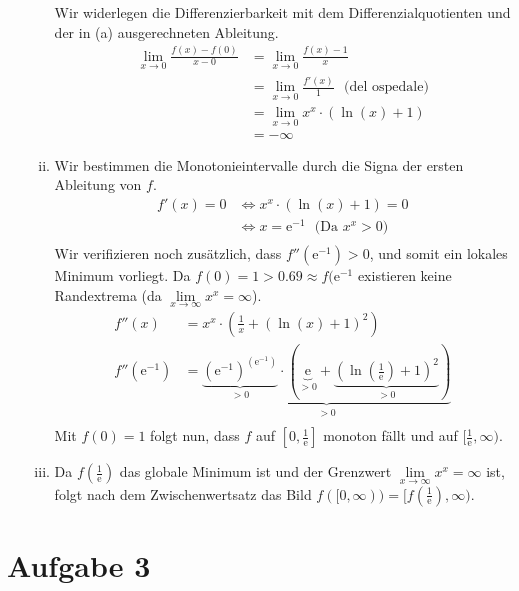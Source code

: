\documentclass{scrreprt}
\newcommand{\round}[1]{\left(#1\right)}
\newcommand{\euler}{\mathrm{e}}
\newcommand{\round}[1]{\left\(#1\right\)}
\begin{document}
\begin{enumerate}[(a)]
\begin{enumerate}[(i)]
        Wir widerlegen die Differenzierbarkeit mit dem Differenzialquotienten und der in (a) ausgerechneten Ableitung.
        \begin{align*}
            \lim\limits_{x \to 0} \frac{f\round{x} - f\round{0}}{x-0} & = \lim\limits_{x \to 0} \frac{f\round{x} - 1}{x}\\
            & = \lim\limits_{x \to 0} \frac{f'\round{x}}{1} ~~~ \text{(del ospedale)}\\
            & = \lim\limits_{x \to 0} x^x \cdot \round{\ln\round{x} + 1}\\
            & = -\infty
        \end{align*}
    \item
        Wir bestimmen die Monotonieintervalle durch die Signa der ersten Ableitung von $f$.
        \begin{align*}
            f'(x) = 0 &\Leftrightarrow x^x \cdot \round{\ln(x) + 1} = 0\\
            & \Leftrightarrow x = \euler^{-1} ~~~ \text{(Da $x^x > 0$)}\\
        \end{align*}
        Wir verifizieren noch zusätzlich, dass $f''(\euler^{-1})>0$, und somit ein lokales Minimum vorliegt. Da $f(0)= 1 > 0.69 \approx f(\euler^{-1}$ existieren keine Randextrema (da $\lim\limits_{x \to \infty} x^x = \infty$).
        \begin{align*}
            f''(x) & = x^x \cdot \round{\frac{1}{x} + \round{\ln\round{x} + 1}^2}\\
            f''(\euler^{-1}) & = \underbrace{ \underbrace{\round{\euler^{-1}}^{\round{\euler^{-1}}}}_{>0} \cdot \round{\underbrace{\euler}_{>0} + \underbrace{\round{\ln\round{\frac{1}{\euler}} + 1}^2}_{>0}}}_{>0}\\
        \end{align*}
        Mit $f(0) =1$ folgt nun, dass $f$ auf $[0,\frac{1}{\euler}]$ monoton fällt und auf $[\frac{1}{\euler},\infty)$.
    \item
        Da $f(\frac{1}{\euler})$ das globale Minimum ist und der Grenzwert $\lim\limits_{x \to \infty} x^x = \infty$ ist, folgt nach dem Zwischenwertsatz das Bild $f([0,\infty)) = [f\round{\frac{1}{\euler}}, \infty)$.
    \end{enumerate}
\end{enumerate}


\section*{Aufgabe 3}
\end{document}
